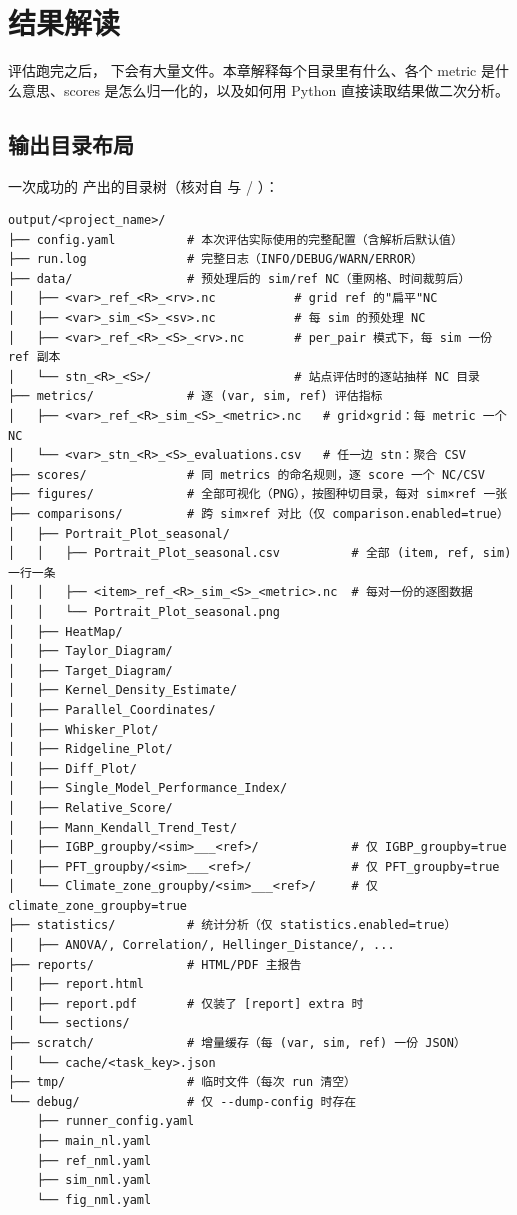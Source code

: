 
\chapter{结果解读}

评估跑完之后， 下会有大量文件。本章解释每个目录里有什么、各个 metric 是什么意思、scores 是怎么归一化的，以及如何用 Python 直接读取结果做二次分析。

\section{输出目录布局}

一次成功的  产出的目录树（核对自  与  / ）：

\begin{verbatim}
output/<project_name>/
├── config.yaml          # 本次评估实际使用的完整配置（含解析后默认值）
├── run.log              # 完整日志（INFO/DEBUG/WARN/ERROR）
├── data/                # 预处理后的 sim/ref NC（重网格、时间裁剪后）
│   ├── <var>_ref_<R>_<rv>.nc           # grid ref 的"扁平"NC
│   ├── <var>_sim_<S>_<sv>.nc           # 每 sim 的预处理 NC
│   ├── <var>_ref_<R>_<S>_<rv>.nc       # per_pair 模式下，每 sim 一份 ref 副本
│   └── stn_<R>_<S>/                    # 站点评估时的逐站抽样 NC 目录
├── metrics/             # 逐 (var, sim, ref) 评估指标
│   ├── <var>_ref_<R>_sim_<S>_<metric>.nc   # grid×grid：每 metric 一个 NC
│   └── <var>_stn_<R>_<S>_evaluations.csv   # 任一边 stn：聚合 CSV
├── scores/              # 同 metrics 的命名规则，逐 score 一个 NC/CSV
├── figures/             # 全部可视化（PNG），按图种切目录，每对 sim×ref 一张
├── comparisons/         # 跨 sim×ref 对比（仅 comparison.enabled=true）
│   ├── Portrait_Plot_seasonal/
│   │   ├── Portrait_Plot_seasonal.csv          # 全部 (item, ref, sim) 一行一条
│   │   ├── <item>_ref_<R>_sim_<S>_<metric>.nc  # 每对一份的逐图数据
│   │   └── Portrait_Plot_seasonal.png
│   ├── HeatMap/
│   ├── Taylor_Diagram/
│   ├── Target_Diagram/
│   ├── Kernel_Density_Estimate/
│   ├── Parallel_Coordinates/
│   ├── Whisker_Plot/
│   ├── Ridgeline_Plot/
│   ├── Diff_Plot/
│   ├── Single_Model_Performance_Index/
│   ├── Relative_Score/
│   ├── Mann_Kendall_Trend_Test/
│   ├── IGBP_groupby/<sim>___<ref>/             # 仅 IGBP_groupby=true
│   ├── PFT_groupby/<sim>___<ref>/              # 仅 PFT_groupby=true
│   └── Climate_zone_groupby/<sim>___<ref>/     # 仅 climate_zone_groupby=true
├── statistics/          # 统计分析（仅 statistics.enabled=true）
│   ├── ANOVA/, Correlation/, Hellinger_Distance/, ...
├── reports/             # HTML/PDF 主报告
│   ├── report.html
│   ├── report.pdf       # 仅装了 [report] extra 时
│   └── sections/
├── scratch/             # 增量缓存（每 (var, sim, ref) 一份 JSON）
│   └── cache/<task_key>.json
├── tmp/                 # 临时文件（每次 run 清空）
└── debug/               # 仅 --dump-config 时存在
    ├── runner_config.yaml
    ├── main_nl.yaml
    ├── ref_nml.yaml
    ├── sim_nml.yaml
    └── fig_nml.yaml
\end{verbatim}

